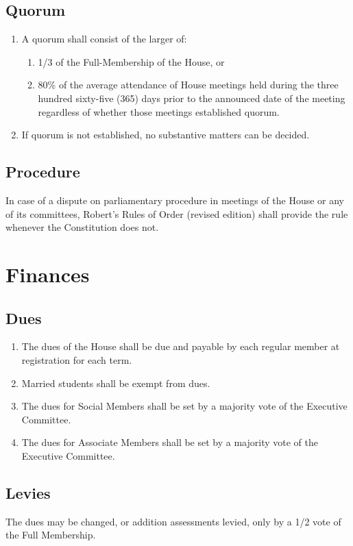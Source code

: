 \documentclass[10pt]{article} %
\begin{document}
\subsection{Quorum}
\begin{enumerate}
\item A quorum shall consist of the larger of:
\begin{enumerate}
\item 1/3 of the Full-Membership of the House, or
\item 80\% of the average attendance of House meetings held during the three hundred sixty-five (365) days prior to the announced date of the meeting regardless of whether those meetings established quorum.
\end{enumerate}
\item If quorum is not established, no substantive matters can be decided.
\end{enumerate}
\subsection{Procedure}
In case of a dispute on parliamentary procedure in meetings of the House or any of its committees, Robert’s Rules of Order (revised edition) shall provide the rule whenever the Constitution does not.
\section{Finances}
\subsection{Dues}
\begin{enumerate}
\item The dues of the House shall be due and payable by each regular member at registration for each term. 
\item Married students shall be exempt from dues.
\item The dues for Social Members shall be set by a majority vote of the Executive Committee.
\item The dues for Associate Members shall be set by a majority vote of the Executive Committee.
\end{enumerate}
\subsection{Levies}
The dues may be changed, or addition assessments levied, only by a 1/2 vote of the Full Membership.
\end{document}

